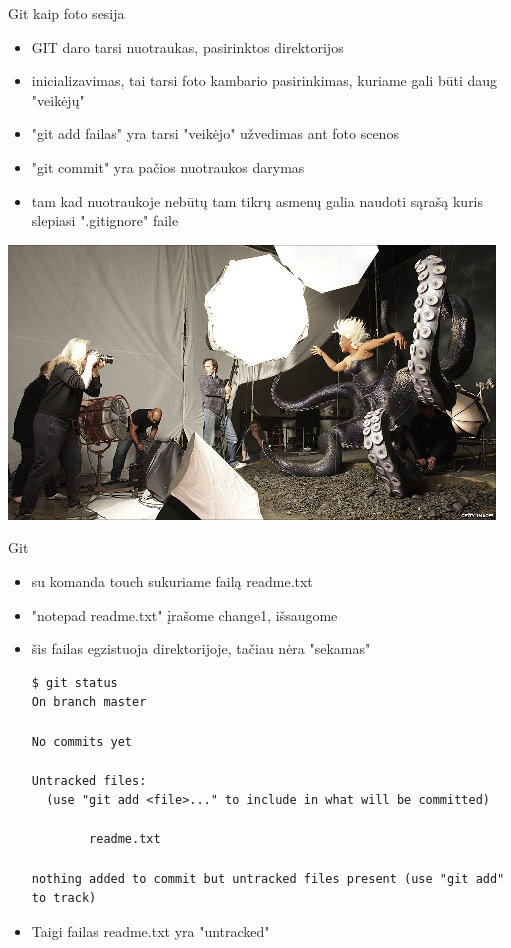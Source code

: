 \documentclass[11pt,xcolor=table]{beamer}
\begin{document}
\begin{frame}{Git kaip foto sesija}
\begin{itemize}
\item GIT daro tarsi nuotraukas, pasirinktos direktorijos
\item inicializavimas, tai tarsi foto kambario pasirinkimas, kuriame gali būti daug "veikėjų"
\item "git add failas" yra tarsi "veikėjo" užvedimas ant foto scenos
\item "git commit" yra pačios nuotraukos darymas
\item tam kad nuotraukoje nebūtų tam tikrų asmenų galia naudoti sąrašą kuris slepiasi ".gitignore" faile
\end{itemize}
\center
\includegraphics[scale=0.4]{photo_session.png}
\end{frame}



\begin{frame}[fragile]{Git}
\begin{itemize}
\item su komanda touch sukuriame failą readme.txt
\item "notepad readme.txt" įrašome change1, išsaugome 
\item šis failas egzistuoja direktorijoje, tačiau nėra "sekamas"
\begin{lstlisting}
$ git status
On branch master

No commits yet

Untracked files:
  (use "git add <file>..." to include in what will be committed)

        readme.txt

nothing added to commit but untracked files present (use "git add" to track)
\end{lstlisting}
\item Taigi failas readme.txt yra "untracked"
\end{itemize}
\end{frame}
\end{document}
